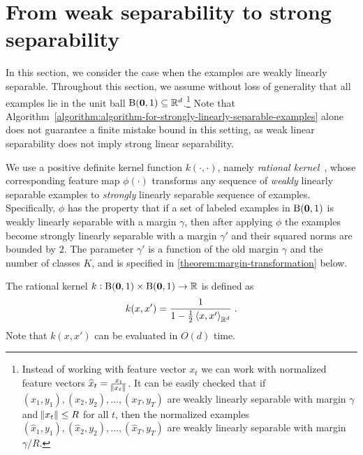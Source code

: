 \section{From weak separability to strong separability}
\label{section:from-weak-separability-to-strong-separability}

In this section, we consider the case when the examples are weakly linearly
separable. Throughout this section, we assume without loss of generality that
all examples lie in the unit ball $\operatorname{B}(\mathbf{0},1) \subseteq \mathbb{R}^d$.\footnote{Instead of
working with feature vector $x_t$ we can work with normalized feature vectors
$\widehat{x}_t = \frac{x_t}{\norm{x_t}}$. It can be easily checked that if
$(x_1,y_1), (x_2,y_2), \dots, (x_T,y_T)$ are weakly linearly separable with
margin $\gamma$ and $\norm{x_t} \le R$ for all $t$, then the normalized examples
$(\widehat{x}_1,y_1), (\widehat{x}_2,y_2), \dots, (\widehat{x}_T,y_T)$ are weakly
linearly separable with margin $\gamma/R$.} Note that
Algorithm~\ref{algorithm:algorithm-for-strongly-linearly-separable-examples}
alone does not guarantee a finite mistake bound in this setting, as weak linear
separability does not imply strong linear separability.

We use a positive definite kernel function $k(\cdot, \cdot)$, namely
\emph{rational kernel}~\citep{Shalev-Shwartz-Shamir-Sridharan-2011}, whose
corresponding feature map $\phi(\cdot)$ transforms any sequence of \emph{weakly}
linearly separable examples to \emph{strongly} linearly separable sequence of
examples. Specifically, $\phi$ has the property that if a set of labeled
examples in $\operatorname{B}(\mathbf{0},1)$ is weakly linearly separable with a margin $\gamma$, then
after applying $\phi$ the examples become strongly linearly separable with a
margin $\gamma'$ and their squared norms are bounded by $2$. The parameter $\gamma'$ is
a function of the old margin $\gamma$ and the number of classes $K$, and is
specified in \autoref{theorem:margin-transformation} below.

The rational kernel $k:\operatorname{B}(\mathbf{0},1) \times \operatorname{B}(\mathbf{0},1) \to \mathbb{R}$ is defined as
\begin{equation}
\label{equation:rational-kernel}
k(x,x') = \frac{1}{1 - \frac{1}{2}\left\langle x, x' \right\rangle_{\mathbb{R}^d}} \; .
\end{equation}
Note that $k(x,x')$ can be evaluated in $O(d)$ time.

